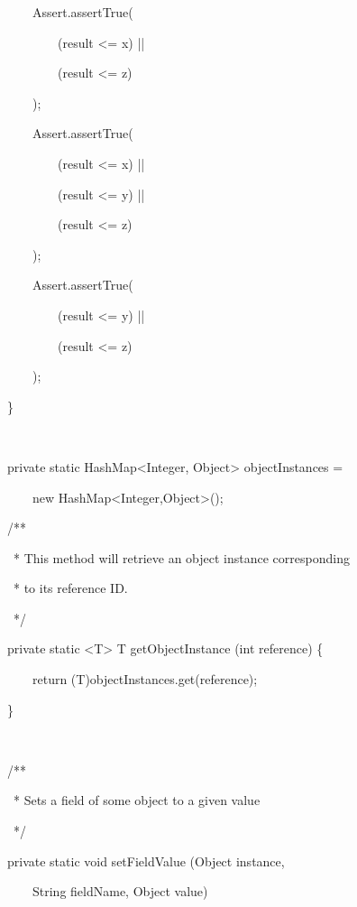 \documentclass{article}
\newenvironment{tmindent}{\begin{tmparmod}{1.5em}{0pt}{0pt} }{\end{tmparmod}}
\newenvironment{tmparmod}[3]{\begin{list}{}{\setlength{\topsep}{0pt}\setlength{\leftmargin}{#1}\setlength{\rightmargin}{#2}\setlength{\parindent}{#3}\setlength{\listparindent}{\parindent}\setlength{\itemindent}{\parindent}\setlength{\parsep}{\parskip}} \item[]}{\end{list}}
\newenvironment{tmparsep}[1]{\begingroup\setlength{\parskip}{#1}}{\endgroup}
\begin{document}
\begin{example}
\begin{tmindent}
\begin{tmparsep}{0em}
      \ \ \ \ \ \ \ Assert.assertTrue(
      
      \ \ \ \ \ \ \ \ \ \ \ (result <= x) ||
      
      \ \ \ \ \ \ \ \ \ \ \ (result <= z)
      
      \ \ \ \ \ \ \ );
      
      \ \ \ \ \ \ \ Assert.assertTrue(
      
      \ \ \ \ \ \ \ \ \ \ \ (result <= x) ||
      
      \ \ \ \ \ \ \ \ \ \ \ (result <= y) ||
      
      \ \ \ \ \ \ \ \ \ \ \ (result <= z)
      
      \ \ \ \ \ \ \ );
      
      \ \ \ \ \ \ \ Assert.assertTrue(
      
      \ \ \ \ \ \ \ \ \ \ \ (result <= y) ||
      
      \ \ \ \ \ \ \ \ \ \ \ (result <= z)
      
      \ \ \ \ \ \ \ );
      
      \ \ \ \}
      
      \ \ \
      
      \ \ \ private static HashMap<Integer, Object> objectInstances =
      
      \ \ \ \ \ \ \ new HashMap<Integer,Object>();
      
      
      
      \ \ \ /**
      
      \ \ \ \ * This method will retrieve an object instance corresponding \
      \ \ \ \
      
      \ \ \ \ * to its reference ID.
      
      \ \ \ \ */
      
      \ \ \ private static <T> T getObjectInstance (int reference) \{
      
      \ \ \ \ \ \ \ return (T)objectInstances.get(reference);
      
      \ \ \ \}
      
      \ \ \
      
      \ \ \ /**
      
      \ \ \ \ * Sets a field of some object to a given value
      
      \ \ \ \ */
      
      \ \ \ private static void setFieldValue (Object instance,
      
      \ \ \ \ \ \ \ String fieldName, Object value)
      

\end{tmparsep}
\end{tmindent}
\end{example}
\end{document}
